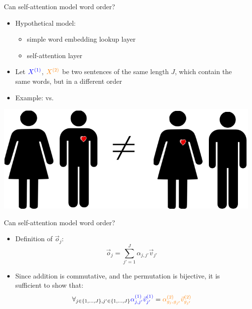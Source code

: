 
\begin{vbframe}{Can self-attention model word order?}

\vfill

\begin{itemize}
	\item Hypothetical model:
			\begin{itemize}
				\item simple word embedding lookup layer
				\item self-attention layer 
			\end{itemize}
	\item Let $\textcolor{blue}{X^{(1)}}$, $\textcolor{orange}{X^{(2)}}$ be two sentences of the same length $J$, which contain the same words, but in a different order
	\item Example:  vs. 
\end{itemize}
\begin{center}
	\includegraphics[width=.6\textwidth]{figure/mary_loves_john}
\end{center}

\vfill

\end{vbframe}


\begin{vbframe}{Can self-attention model word order?}

\vfill

\begin{itemize}
\item Definition of $\vec o_j$:
$$\vec o_j = \sum_{j'=1}^J \alpha_{j,j'} \vec v_{j'}$$
\item Since addition is commutative, and the permutation is bijective, it is sufficient to show that:
$$\forall_{j \in \{1,...,J\}, j' \in \{1,...,J\}} \textcolor{blue}{\alpha^{(1)}_{j,j'} \vec v^{(1)}_{j'}} = \textcolor{orange}{\alpha^{(2)}_{g_j,g_{j'}} \vec v^{(2)}_{g_{j'}}}$$
\end{itemize}

\vfill

\end{vbframe}

